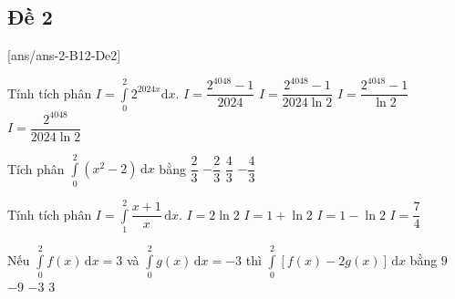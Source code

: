 \subsection{Đề 2}
[ans/ans-2-B12-De2]
\caulc
\begin{ex}%
	Tính tích phân $I=\displaystyle \int \limits _0^2 2^{2024x} \mathrm{d}x$.
	\choice
	{$I=\dfrac{2^{4048}-1}{2024}$}
	{\True $I=\dfrac{2^{4048}-1}{2024 \ln 2} $}
	{$I=\dfrac{2^{4048}-1}{\ln 2}$}
	{$I=\dfrac{2^{4048}}{2024 \ln2} $}
\end{ex}
\begin{ex}%
	Tích phân $\displaystyle\int\limits_0^2 \left(x^2-2\right)\mathrm{\,d}x$ bằng
	\choice
	{$\dfrac{2}{3}$}
	{$-\dfrac{2}{3}$}
	{$\dfrac{4}{3}$}
	{\True $-\dfrac{4}{3}$}
\end{ex}
\begin{ex}%
	Tính tích phân $I=\displaystyle\int\limits_1^2 \dfrac{x+1}{x} \mathrm{\,d}x$.
	\choice
	{$I=2\ln 2$}
	{\True $I=1+\ln 2$}
	{$I=1-\ln 2$}
	{$I=\dfrac{7}{4}$}
\end{ex}
\begin{ex}%
	Nếu $\displaystyle\int\limits_0^2f(x)\mathrm{\, d}x=3$ và $\displaystyle\int\limits_0^2g(x)\mathrm{\, d}x=-3$ thì $\displaystyle\int\limits_0^2\left[f(x)-2g(x)\right]\mathrm{\, d}x$ bằng
	\choice
	{\True $9$}
	{$-9$}
	{$-3$}
	{$3$}
\end{ex}

